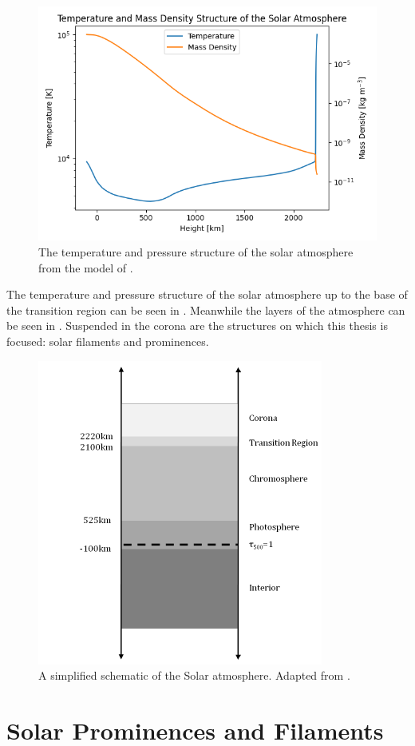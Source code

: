 \begin{figure}
    \centering
    \includegraphics[width=.7\linewidth]{./00Introduction/figs/atmosphere.png}
    \caption[The temperature and pressure structure of the solar atmosphere from the model of \cite{fontenla_energy_1993}]{The temperature and pressure structure of the solar atmosphere from the model of \cite{fontenla_energy_1993}.}
    \label{atmos}
\end{figure}
The temperature and pressure structure of the solar atmosphere up to the base of the transition region can be seen in . Meanwhile the layers of the atmosphere can be seen in . Suspended in the corona are the structures on which this thesis is focused: solar filaments and prominences.
\begin{figure}
    \centering
    \includegraphics[width=.5\linewidth]{./00Introduction/figs/layers.pdf}
    \caption[A simplified schematic of the Solar atmosphere. Adapted from \cite{carroll_introduction_2007}]{A simplified schematic of the Solar atmosphere. Adapted from \cite{carroll_introduction_2007}.}
    \label{layers}
\end{figure}

\section{Solar Prominences and Filaments}

